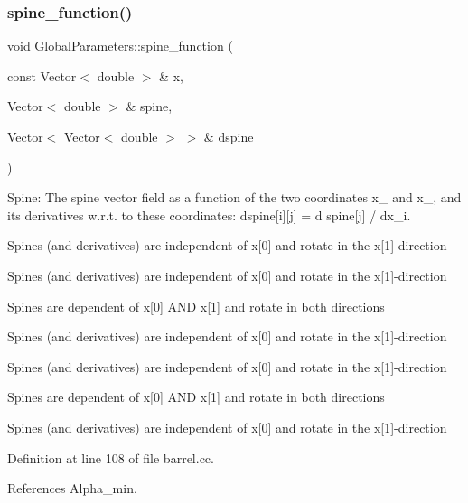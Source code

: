 \mbox{\label{namespaceGlobalParameters_a82df8c67f58e78a236fb6a0cc8bf8284}} 
\subsubsection{\texorpdfstring{spine\+\_\+function()}{spine\_function()}}
{\footnotesize\ttfamily void Global\+Parameters\+::spine\+\_\+function (\begin{DoxyParamCaption}\item[{const Vector$<$ double $>$ \&}]{x,  }\item[{Vector$<$ double $>$ \&}]{spine,  }\item[{Vector$<$ Vector$<$ double $>$ $>$ \&}]{dspine }\end{DoxyParamCaption})}



Spine\+: The spine vector field as a function of the two coordinates x\+\_ and x\+\_, and its derivatives w.\+r.\+t. to these coordinates\+: dspine\mbox{[}i\mbox{]}\mbox{[}j\mbox{]} = d spine\mbox{[}j\mbox{]} / dx\+\_\+i. 

Spines (and derivatives) are independent of x\mbox{[}0\mbox{]} and rotate in the x\mbox{[}1\mbox{]}-\/direction

Spines (and derivatives) are independent of x\mbox{[}0\mbox{]} and rotate in the x\mbox{[}1\mbox{]}-\/direction

Spines are dependent of x\mbox{[}0\mbox{]} A\+ND x\mbox{[}1\mbox{]} and rotate in both directions

Spines (and derivatives) are independent of x\mbox{[}0\mbox{]} and rotate in the x\mbox{[}1\mbox{]}-\/direction

Spines (and derivatives) are independent of x\mbox{[}0\mbox{]} and rotate in the x\mbox{[}1\mbox{]}-\/direction

Spines are dependent of x\mbox{[}0\mbox{]} A\+ND x\mbox{[}1\mbox{]} and rotate in both directions

Spines (and derivatives) are independent of x\mbox{[}0\mbox{]} and rotate in the x\mbox{[}1\mbox{]}-\/direction 

Definition at line 108 of file barrel.\+cc.



References Alpha\+\_\+min.



